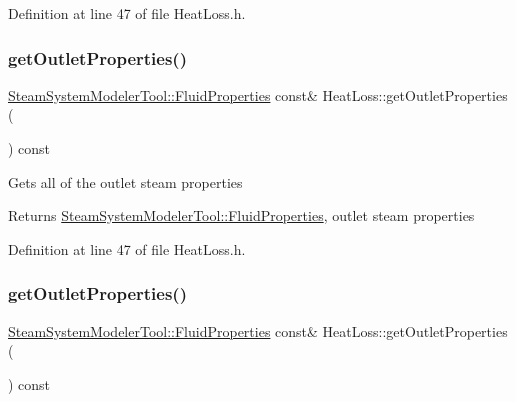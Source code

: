 Definition at line 47 of file Heat\+Loss.\+h.

\mbox{\label{class_heat_loss_a3e483dda6f393d67d7a0f28bcd75e545}} 
\subsubsection{\texorpdfstring{get\+Outlet\+Properties()}{getOutletProperties()}\hspace{0.1cm}{\footnotesize\ttfamily [2/3]}}
{\footnotesize\ttfamily \hyperlink{struct_steam_system_modeler_tool_1_1_fluid_properties}{Steam\+System\+Modeler\+Tool\+::\+Fluid\+Properties} const\& Heat\+Loss\+::get\+Outlet\+Properties (\begin{DoxyParamCaption}{ }\end{DoxyParamCaption}) const\hspace{0.3cm}{\ttfamily [inline]}}

Gets all of the outlet steam properties \begin{DoxyReturn}{Returns}
\hyperlink{struct_steam_system_modeler_tool_1_1_fluid_properties}{Steam\+System\+Modeler\+Tool\+::\+Fluid\+Properties}, outlet steam properties 
\end{DoxyReturn}


Definition at line 47 of file Heat\+Loss.\+h.

\mbox{\label{class_heat_loss_a3e483dda6f393d67d7a0f28bcd75e545}} 
\subsubsection{\texorpdfstring{get\+Outlet\+Properties()}{getOutletProperties()}\hspace{0.1cm}{\footnotesize\ttfamily [3/3]}}
{\footnotesize\ttfamily \hyperlink{struct_steam_system_modeler_tool_1_1_fluid_properties}{Steam\+System\+Modeler\+Tool\+::\+Fluid\+Properties} const\& Heat\+Loss\+::get\+Outlet\+Properties (\begin{DoxyParamCaption}{ }\end{DoxyParamCaption}) const\hspace{0.3cm}{\ttfamily [inline]}}

